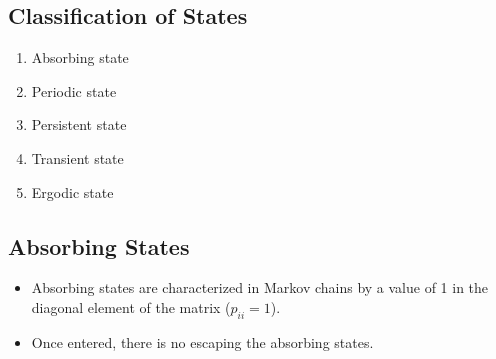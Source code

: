 ﻿\subsection{Classification of States}
\begin{enumerate}
\item Absorbing state
\item Periodic state
\item Persistent state
\item Transient state
\item Ergodic state
\end{enumerate}

\subsection*{Absorbing States}
\begin{itemize}
\item Absorbing states are characterized in Markov chains by a value of 1 in the diagonal
element of the matrix ($p_{ii} = 1$).
\item Once entered, there is no escaping the absorbing
states.
\end{itemize}
